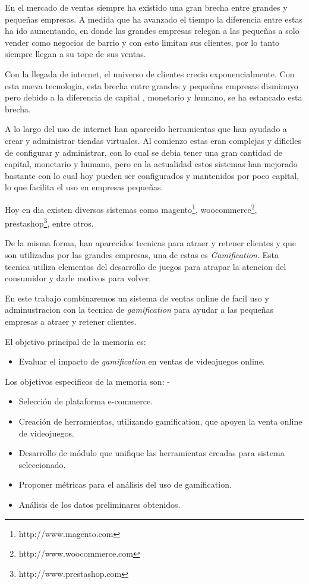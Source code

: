 En el mercado de ventas siempre ha existido una gran brecha entre grandes y pequeñas 
empresas. A medida que ha avanzado el tiempo la diferencia entre estas ha ido aumentando,
en donde las grandes empresas relegan a las pequeñas a solo vender como negocios de 
barrio y con esto limitan sus clientes, por lo tanto siempre llegan a su tope de sus ventas. 

Con la llegada de internet, el universo de clientes crecio exponencialmente. Con esta nueva
tecnologia, esta brecha entre grandes y pequeñas empresas disminuyo pero debido a la diferencia de capital
, monetario y humano, se ha estancado esta brecha. 

A lo largo del uso de internet han aparecido herramientas que han ayudado a crear y
administrar tiendas virtuales. Al comienzo estas eran complejas y dificiles de configurar
y administrar, con lo cual se debia tener una gran cantidad de capital, monetario y humano,
pero en la actualidad estos sistemas han mejorado bastante con lo cual hoy pueden ser
configurados y mantenidos por poco capital, lo que facilita el uso en empresas pequeñas.

Hoy en dia existen diversos sistemas como magento\footnote{http://www.magento.com}, 
woocommerce\footnote{http://www.woocommerce.com}, prestashop\footnote{http://www.prestashop.com},
entre otros. 

De la misma forma, han aparecidos tecnicas para atraer y retener clientes y que son utilizadas
por las grandes empresas, una de estas es \emph{Gamification}. Esta tecnica utiliza elementos
del desarrollo de juegos para atrapar la atencion del consumidor y darle motivos para volver.

En este trabajo combinaremos un sistema de ventas online de facil uso y adminustracion con
la tecnica de \emph{gamification} para ayudar a las pequeñas empresas a atraer y retener 
clientes.

El objetivo principal de la memoria es:
\begin{itemize}
\item Evaluar el impacto de \emph{gamification} en ventas de videojuegos online.
\end{itemize}

Los objetivos especificos de la memoria son:
-
\begin{itemize}                                                                      
\item Selección de plataforma e-commerce.
\item Creación de herramientas, utilizando gamification, que apoyen la venta online 
de videojuegos.
\item Desarrollo de módulo que unifique las herramientas creadas para sistema 
seleccionado.
\item Proponer métricas para el análisis del uso de gamification.
\item Análisis de los datos preliminares obtenidos.     
\end{itemize}

